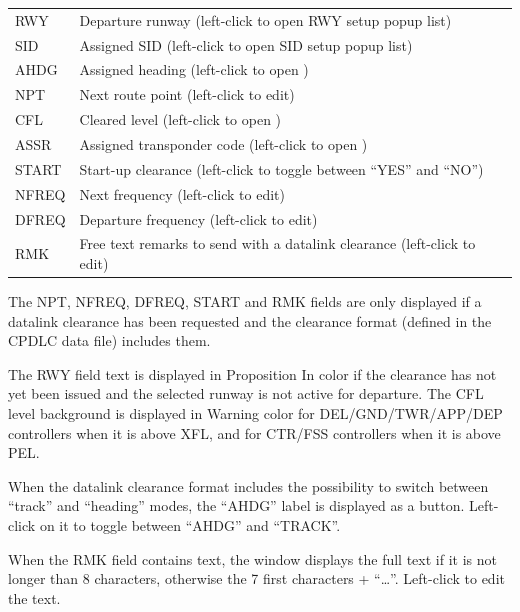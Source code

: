 \documentclass[a4paper,oneside,11pt]{memoir}
\newcommand{\colorref}[1]{\colorbox{Flight Highlight}{\color{#1}#1}}
\newcommand{\winref}[1]{\textit{\titleref{#1}}}
\begin{document}
\bigskip

\begin{longtable}{p{2.5cm} p{10cm}}
    RWY     & Departure runway (left-click to open RWY setup popup list)\\
    SID     & Assigned SID (left-click to open SID setup popup list)\\
    AHDG    & Assigned heading (left-click to open \winref{menu:ahdg})\\
    NPT     & Next route point (left-click to edit)\\
    CFL     & Cleared level (left-click to open \winref{menu:cfl})\\
    ASSR    & Assigned transponder code (left-click to open \winref{menu:assr})\\
    START   & Start-up clearance (left-click to toggle between “YES” and “NO”)\\
    NFREQ   & Next frequency (left-click to edit)\\
    DFREQ   & Departure frequency (left-click to edit)\\
    RMK     & Free text remarks to send with a datalink clearance (left-click to edit)\\
\end{longtable}

\bigskip

The NPT, NFREQ, DFREQ, START and RMK fields are only displayed if a datalink clearance has been requested and the clearance format (defined in the CPDLC data file) includes them.

\bigskip

The RWY field text is displayed in \colorref{Proposition In} color if the clearance has not yet been issued and the selected runway is not active for departure. The CFL level background is displayed in \colorref{Warning} color for DEL/GND/TWR/APP/DEP controllers when it is above XFL, and for CTR/FSS controllers when it is above PEL.

\bigskip

When the datalink clearance format includes the possibility to switch between “track” and “heading” modes, the “AHDG” label is displayed as a button. Left-click on it to toggle between “AHDG” and “TRACK”.

\bigskip

When the RMK field contains text, the window displays the full text if it is not longer than 8 characters, otherwise the 7 first characters + “…”. Left-click to edit the text.

\bigskip
\end{document}
